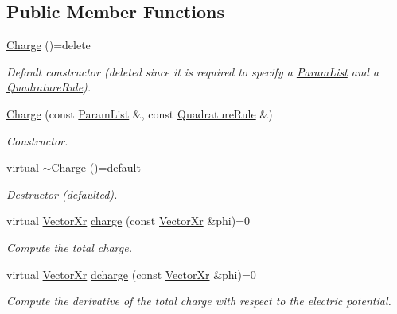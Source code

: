 \subsection*{Public Member Functions}
\begin{DoxyCompactItemize}
\item 
\hypertarget{classCharge_ad8bd7ca1f5eb4af83b0457a01aeeb001}{\hyperlink{classCharge_ad8bd7ca1f5eb4af83b0457a01aeeb001}{Charge} ()=delete}\label{classCharge_ad8bd7ca1f5eb4af83b0457a01aeeb001}

\begin{DoxyCompactList}\small\item\em Default constructor (deleted since it is required to specify a \hyperlink{classParamList}{Param\-List} and a \hyperlink{classQuadratureRule}{Quadrature\-Rule}). \end{DoxyCompactList}\item 
\hyperlink{classCharge_a447211f3a5181d4efb8f2c7f1012c32b}{Charge} (const \hyperlink{classParamList}{Param\-List} \&, const \hyperlink{classQuadratureRule}{Quadrature\-Rule} \&)
\begin{DoxyCompactList}\small\item\em Constructor. \end{DoxyCompactList}\item 
\hypertarget{classCharge_ad350b0cd3356862aacbf538e6cffac61}{virtual \hyperlink{classCharge_ad350b0cd3356862aacbf538e6cffac61}{$\sim$\-Charge} ()=default}\label{classCharge_ad350b0cd3356862aacbf538e6cffac61}

\begin{DoxyCompactList}\small\item\em Destructor (defaulted). \end{DoxyCompactList}\item 
virtual \hyperlink{typedefs_8h_aae6cee78ed9cd8f234ed8cb48682548a}{Vector\-Xr} \hyperlink{classCharge_a597abd6d429e1c18935e4806082d67d8}{charge} (const \hyperlink{typedefs_8h_aae6cee78ed9cd8f234ed8cb48682548a}{Vector\-Xr} \&phi)=0
\begin{DoxyCompactList}\small\item\em Compute the total charge. \end{DoxyCompactList}\item 
virtual \hyperlink{typedefs_8h_aae6cee78ed9cd8f234ed8cb48682548a}{Vector\-Xr} \hyperlink{classCharge_acd71b3197f9081512d70d96ac694a3fc}{dcharge} (const \hyperlink{typedefs_8h_aae6cee78ed9cd8f234ed8cb48682548a}{Vector\-Xr} \&phi)=0
\begin{DoxyCompactList}\small\item\em Compute the derivative of the total charge with respect to the electric potential. \end{DoxyCompactList}\end{DoxyCompactItemize}
